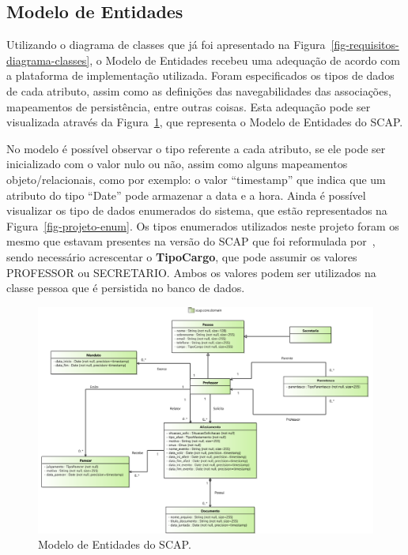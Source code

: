 \FloatBarrier

\subsection{Modelo de Entidades}
\label{sec-projeto-modelo-entidades}

Utilizando o diagrama de classes que já foi apresentado na Figura~\ref{fig-requisitos-diagrama-classes}, o Modelo de Entidades recebeu uma adequação de acordo com a plataforma de implementação utilizada. Foram especificados os tipos de dados de cada atributo, assim como as definições das navegabilidades das associações, mapeamentos de persistência, entre outras coisas. Esta adequação pode ser visualizada através da Figura~\ref{fig-projeto-entidades}, que representa o Modelo de Entidades do SCAP.

No modelo é possível observar o tipo referente a cada atributo, se ele pode ser inicializado com o valor nulo ou não, assim como alguns mapeamentos objeto/relacionais, como por exemplo: o valor ``timestamp'' que indica que um atributo do tipo ``Date'' pode armazenar a data e a hora. Ainda é possível visualizar os tipo de dados enumerados do sistema, que estão representados na Figura~\ref{fig-projeto-enum}. Os tipos enumerados utilizados neste projeto foram os mesmo que estavam presentes na versão do SCAP que foi reformulada por~, sendo necessário acrescentar o \textbf{TipoCargo}, que pode assumir os valores PROFESSOR ou SECRETARIO. Ambos os valores podem ser utilizados na classe pessoa que é persistida no banco de dados.   

\begin{figure}[!h]
	\centering
	\includegraphics[scale=0.45]{figuras/fig-projeto-entidades} 
	\caption{Modelo de Entidades do SCAP.}
	\label{fig-projeto-entidades}
\end{figure}

